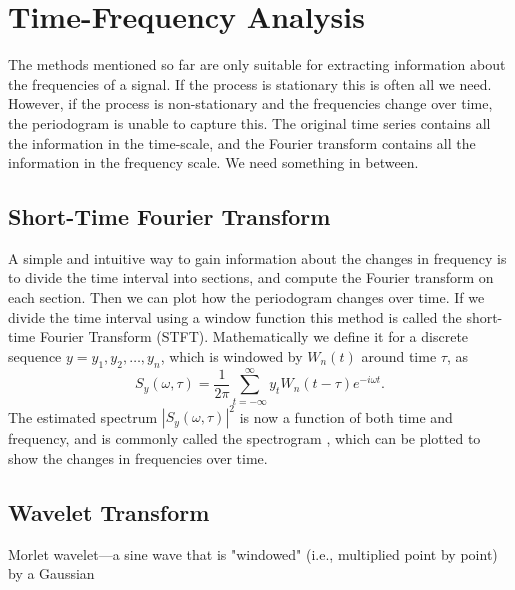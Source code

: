\documentclass[a4paper]{memoir}
\theoremstyle{plain}
\theoremstyle{definition}
\theoremstyle{remark}
\begin{document}
\section{Time-Frequency Analysis}
The methods mentioned so far are only suitable for extracting information about the frequencies of a signal.
If the process is stationary this is often all we need.
However, if the process is non-stationary and the frequencies change over time, the periodogram is unable to capture this.
The original time series contains all the information in the time-scale, and the Fourier transform contains all the information in the frequency scale.
We need something in between.

\subsection{Short-Time Fourier Transform}
A simple and intuitive way to gain information about the changes in frequency is to divide the time interval into sections, and compute the Fourier transform on each section.
Then we can plot how the periodogram changes over time.
If we divide the time interval using a window function this method is called the short-time Fourier Transform (STFT).
Mathematically we define it for a discrete sequence $y = y_1, y_2, \hdots, y_n$, which is windowed by $W_n(t)$ around time $\tau$, as
\begin{equation}\label{eq:stft}
        S_y(\omega, \tau) = \frac{1}{2 \pi} \sum_{t = -\infty}^{\infty}y_t W_n(t - \tau)e^{-i\omega t}.
\end{equation}
The estimated spectrum $|S_y(\omega, \tau)|^2$ is now a function of both time and frequency, and is commonly called the spectrogram \cite{cohen}, which can be plotted to show the changes in frequencies over time.












\subsection{Wavelet Transform}
Morlet wavelet—a sine wave that is "windowed" (i.e., multiplied point by point) by a Gaussian
\end{document}
